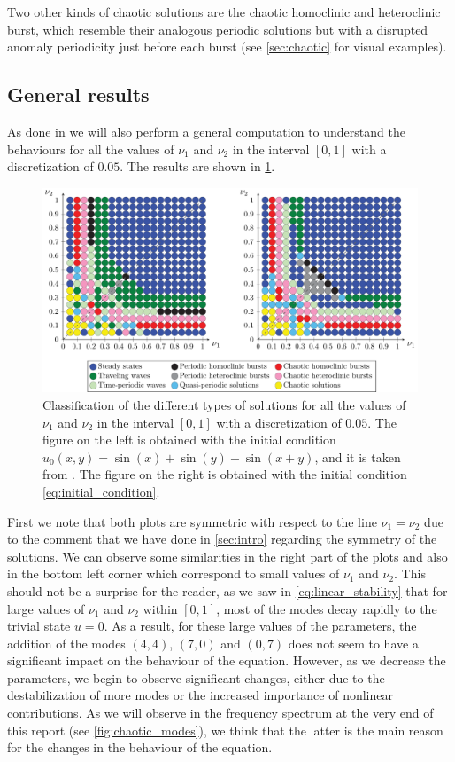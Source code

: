 \documentclass[twoside]{article}
\begin{document}
Two other kinds of chaotic solutions are the chaotic homoclinic and heteroclinic burst, which resemble their analogous periodic solutions but with a disrupted anomaly periodicity just before each burst (see \cref{sec:chaotic} for visual examples).

\subsection{General results}\label{sec:general_results}
As done in \cite{Kalogirou2015} we will also perform a general computation to understand the behaviours for all the values of $\nu_1$ and $\nu_2$ in the interval $[0,1]$ with a discretization of $0.05$. The results are shown in \cref{fig:classification_nu1_nu2}.

\begin{figure}[ht]
  \centering
  \includegraphics[width=\textwidth]{images/nu1-nu2.pdf}
  \caption{Classification of the different types of solutions for all the values of $\nu_1$ and $\nu_2$ in the interval $[0,1]$ with a discretization of $0.05$. The figure on the left is obtained with the initial condition $u_0(x,y) = \sin(x) + \sin(y) + \sin(x+y)$, and it is taken from \cite{Kalogirou2015}. The figure on the right is obtained with the initial condition \cref{eq:initial_condition}.}
  \label{fig:classification_nu1_nu2}
\end{figure}

First we note that both plots are symmetric with respect to the line $\nu_1=\nu_2$ due to the comment that we have done in \cref{sec:intro} regarding the symmetry of the solutions. We can observe some similarities in the right part of the plots and also in the bottom left corner which correspond to small values of $\nu_1$ and $\nu_2$. This should not be a surprise for the reader, as we saw in \cref{eq:linear_stability} that for large values of $\nu_1$ and $\nu_2$ within $[0,1]$, most of the modes decay rapidly to the trivial state $u=0$. As a result, for these large values of the parameters, the addition of the modes $(4,4)$, $(7,0)$ and $(0,7)$ does not seem to have a significant impact on the behaviour of the equation. However, as we decrease the parameters, we begin to observe significant changes, either due to the destabilization of more modes or the increased importance of nonlinear contributions. As we will observe in the frequency spectrum at the very end of this report (see \cref{fig:chaotic_modes}), we think that the latter is the main reason for the changes in the behaviour of the equation.
\end{document}
